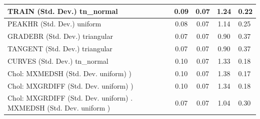 \begin{table}
\begin{center}
\begin{tabular}{|l|l|c|c|c|l|}
			\hline
			TRAIN (Std. Dev.) tn_normal &  & 0.09 & 0.07 & 1.24 & 0.22 \\
			\hline
			PEAKHR (Std. Dev.) uniform &  & 0.08 & 0.07 & 1.14 & 0.25 \\
			\hline
			GRADEBR (Std. Dev.) triangular &  & 0.07 & 0.07 & 0.90 & 0.37 \\
			\hline
			TANGENT (Std. Dev.) triangular &  & 0.07 & 0.07 & 0.90 & 0.37 \\
			\hline
			CURVES (Std. Dev.) tn_normal &  & 0.10 & 0.07 & 1.33 & 0.18 \\
			\hline
			 Chol: MXMEDSH (Std. Dev. uniform) ) &  & 0.10 & 0.07 & 1.38 & 0.17 \\
			\hline
			 Chol: MXGRDIFF (Std. Dev. uniform) ) &  & 0.10 & 0.07 & 1.34 & 0.18 \\
			\hline
			 Chol: MXGRDIFF (Std. Dev. uniform) . MXMEDSH (Std. Dev.   uniform ) &  & 0.07 & 0.07 & 1.04 & 0.30 \\
			\hline
		\end{tabular}
	\end{center}
\end{table}